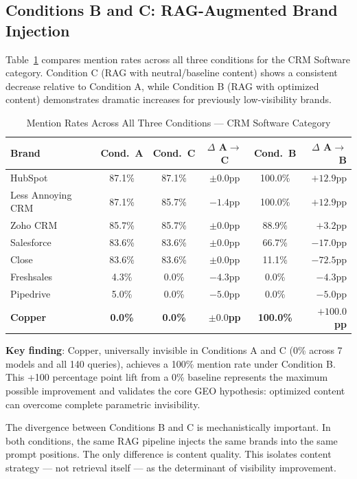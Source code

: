\documentclass{article}
\begin{document}
\subsection{Conditions B and C: RAG-Augmented Brand Injection}

Table~\ref{tab:rag} compares mention rates across all three conditions for the CRM Software category. Condition C (RAG with neutral/baseline content) shows a consistent decrease relative to Condition A, while Condition B (RAG with optimized content) demonstrates dramatic increases for previously low-visibility brands.

\begin{table}[h]
\centering
\caption{Mention Rates Across All Three Conditions — CRM Software Category}
\label{tab:rag}
\small
\begin{tabular}{lccccr}
\toprule
\textbf{Brand} & \textbf{Cond.\ A} & \textbf{Cond.\ C} & \textbf{$\Delta$ A$\to$C} & \textbf{Cond.\ B} & \textbf{$\Delta$ A$\to$B} \\
\midrule
HubSpot           & 87.1\% & 87.1\% & $\pm 0.0$pp & 100.0\% & $+12.9$pp \\
Less Annoying CRM & 87.1\% & 85.7\% & $-1.4$pp    & 100.0\% & $+12.9$pp \\
Zoho CRM          & 85.7\% & 85.7\% & $\pm 0.0$pp & 88.9\%  & $+3.2$pp  \\
Salesforce        & 83.6\% & 83.6\% & $\pm 0.0$pp & 66.7\%  & $-17.0$pp \\
Close             & 83.6\% & 83.6\% & $\pm 0.0$pp & 11.1\%  & $-72.5$pp \\
Freshsales        & 4.3\%  & 0.0\%  & $-4.3$pp    & 0.0\%   & $-4.3$pp  \\
Pipedrive         & 5.0\%  & 0.0\%  & $-5.0$pp    & 0.0\%   & $-5.0$pp  \\
\textbf{Copper}   & \textbf{0.0\%}  & \textbf{0.0\%}  & \textbf{$\pm 0.0$pp} & \textbf{100.0\%} & \textbf{$+100.0$pp} \\
\bottomrule
\end{tabular}
\end{table}

\noindent\textbf{Key finding}: Copper, universally invisible in Conditions A and C (0\% across 7 models and all 140 queries), achieves a 100\% mention rate under Condition B. This +100 percentage point lift from a 0\% baseline represents the maximum possible improvement and validates the core GEO hypothesis: optimized content can overcome complete parametric invisibility.

The divergence between Conditions B and C is mechanistically important. In both conditions, the same RAG pipeline injects the same brands into the same prompt positions. The only difference is content quality. This isolates content strategy — not retrieval itself — as the determinant of visibility improvement.
\end{document}
